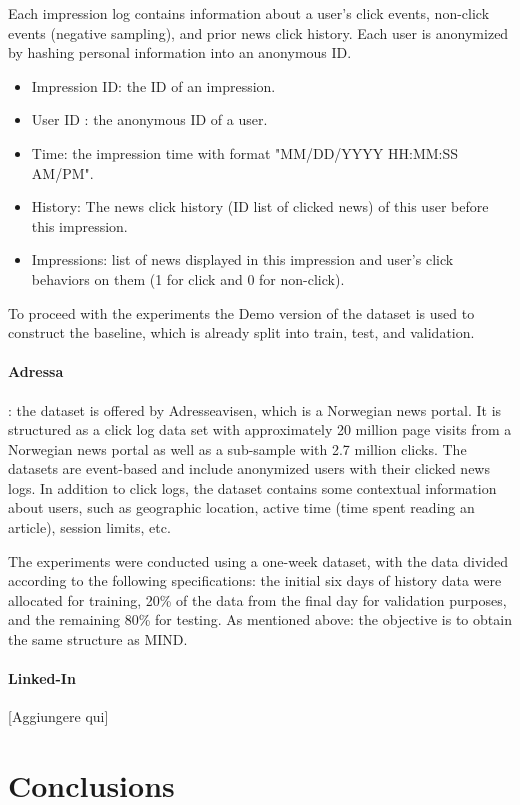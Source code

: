 \documentclass[conference]{IEEEtran}
\begin{document}
Each impression log contains information about a user's click events, non-click events (negative sampling), and prior news click history. Each user is anonymized by hashing personal information into an anonymous ID.
\begin{itemize}
    \item Impression ID: the ID of an impression.
    \item User ID : the anonymous ID of a user.
    \item Time: the impression time with format "MM/DD/YYYY HH:MM:SS AM/PM".
    \item History: The news click history (ID list of clicked news) of this user before this impression.
    \item Impressions: list of news displayed in this impression and user's click behaviors on them (1 for click and 0 for non-click).
\end{itemize}

To proceed with the experiments the Demo version of the dataset is used to construct the baseline, which is already split into train, test, and validation.

\paragraph{Adressa}: the dataset is offered by Adresseavisen, which is a Norwegian news portal. It is structured as a click log data set with approximately 20 million page visits from a Norwegian news portal as well as a sub-sample with 2.7 million clicks.
The datasets are event-based and include anonymized users with their clicked news logs. In addition to click logs, the dataset contains some contextual information about users, such as geographic location, active time (time spent reading an article), session limits, etc.

The experiments were conducted using a one-week dataset, with the data divided according to the following specifications: the initial six days of history data were allocated for training, 20\% of the data from the final day for validation purposes, and the remaining 80\% for testing.
As mentioned above: the objective is to obtain the same structure as MIND.


\paragraph{Linked-In} [Aggiungere qui]
\section{Conclusions}



\end{document}

